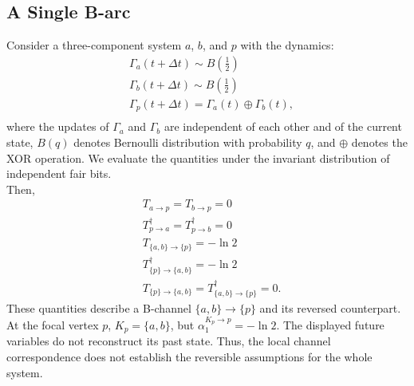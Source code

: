 \documentclass{comnet}%
\begin{document}
\subsection{\label{app:Identification_Examples_B} A Single B-arc}
Consider a three-component system $a$, $b$, and $p$ with the dynamics:
\begin{equation}\begin{aligned}
		&\Gamma_{a}(t + \Delta t) \sim B(\frac{1}{2})\\
		&\Gamma_{b}(t + \Delta t) \sim B(\frac{1}{2})\\
		&\Gamma_{p}(t + \Delta t) = \Gamma_{a}(t) \oplus \Gamma_{b}(t),\\
\end{aligned}\end{equation}
where the updates of $\Gamma_a$ and $\Gamma_b$ are independent of each other and of the current state, $B(q)$ denotes Bernoulli distribution with probability $q$, and $\oplus$ denotes the XOR operation. We evaluate the quantities under the invariant distribution of independent fair bits.\\
Then,
\begin{equation}\begin{aligned}
		&T_{a \to p} = T_{b \to p} = 0\\
		&T^{\dagger}_{p \to a} = T^{\dagger}_{p \to b} = 0\\
		&T_{\{a,b\} \to \{p\}} = - \ln 2\\
		&T^{\dagger}_{\{p\} \to \{a,b\}} = - \ln 2\\
		&T_{\{p\} \to \{a,b\}} = T^{\dagger}_{\{a,b\} \to \{p\}} = 0.
\end{aligned}\end{equation}
These quantities describe a B-channel $\{a,b\}\to\{p\}$ and its reversed counterpart. At the focal vertex $p$, $K_p=\{a,b\}$, but $\alpha_1^{K_p\to p}=-\ln 2$. The displayed future variables do not reconstruct its past state. Thus, the local channel correspondence does not establish the reversible assumptions for the whole system.
\end{document}
